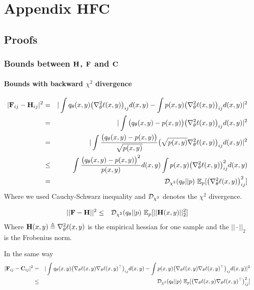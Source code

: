 \chapter{Appendix HFC}

\section{Proofs}

\subsection{Bounds between \texorpdfstring{${\mathbf{H}}$}{H}, \texorpdfstring{${\mathbf{F}}$}{F} and \texorpdfstring{${\mathbf{C}}$}{C}}
\label{app:bounds}

\subsubsection{Bounds with backward \texorpdfstring{$\chi^2$}{chi-2} divergence}
\begin{eqnarray*}
|{\mathbf{F}}_{ij} - {\mathbf{H}}_{ij}|^2 &=& |\int q_\theta(x, y) \big(\nabla_\theta^2 \ell(x, y)\big)_{ij} d(x, y) - \int p(x, y) \big(\nabla_\theta^2 \ell(x, y)\big)_{ij} d(x, y)|^2\\
&=& |\int \big(q_\theta(x, y) - p(x, y)\big) \big(\nabla_\theta^2 \ell(x, y)\big)_{ij} d(x, y)|^2\\
&=& |\int \frac{\big(q_\theta(x, y) - p(x, y)\big)}{\sqrt{p(x, y)}} \big(\sqrt{p(x, y)} \nabla_\theta^2 \ell(x, y)\big)_{ij} d(x, y)|^2\\
&\le& \int \frac{\big(q_\theta(x, y) - p(x, y)\big)^2}{p(x, y)} d(x, y) \int p(x, y)  \big(\nabla_\theta^2 \ell(x, y)\big)_{ij}^2 d(x, y)\\
&=& {\mathcal{D}}_{\chi^2}(q_\theta||p) \ \mathbb{E}_p [ \big(\nabla_\theta^2 \ell(x, y)\big)_{ij}^2 ]
\end{eqnarray*}
Where we used Cauchy-Schwarz inequality and ${\mathcal{D}}_{\chi^2}$ denotes the $\chi^2$ divergence.

\begin{eqnarray*}
||{\mathbf{F}} - {\mathbf{H}}||^2 &\le& {\mathcal{D}}_{\chi^2}(q_\theta||p) \ \mathbb{E}_p [ ||{\mathbf{H}}(x, y)||^2_2 ]
\end{eqnarray*}
Where ${\mathbf{H}}(x, y) \triangleq \nabla_\theta^2 \ell(x, y)$ is the empirical hessian for one sample and the $|| \cdot ||_2$ is the Frobenius norm.

In the same way
\begin{eqnarray*}
|{\mathbf{F}}_{ij} - {\mathbf{C}}_{ij}|^2 &=& |\int q_\theta(x, y) \big(\nabla_\theta \ell(x, y) \nabla_\theta \ell(x, y)^\top \big)_{ij} d(x, y) - \int p(x, y) \big(\nabla_\theta \ell(x, y) \nabla_\theta \ell(x, y)^\top \big)_{ij} d(x, y)|^2\\
&\le& {\mathcal{D}}_{\chi^2}(q_\theta||p) \ \mathbb{E}_p [ \big(\nabla_\theta \ell(x, y) \nabla_\theta \ell(x, y)^\top \big)_{ij}^2 ]
\end{eqnarray*}

